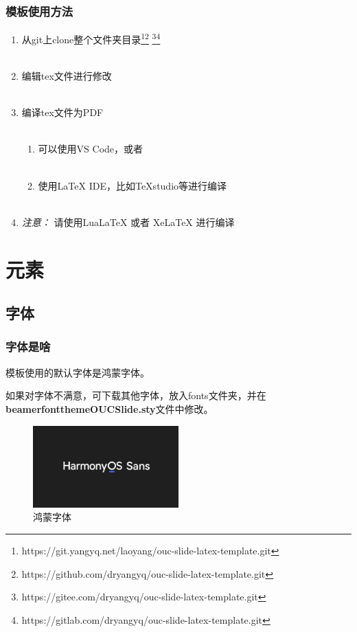 \documentclass[aspectratio=169,UTF8,t]{beamer}%
\begin{document}
\begin{frame}
    \frametitle{模板使用方法}    
    \begin{enumerate}
        \item 从git上clone整个文件夹目录\footnote{https://git.yangyq.net/laoyang/ouc-slide-latex-template.git }\footnote{https://github.com/dryangyq/ouc-slide-latex-template.git} \footnote{https://gitee.com/dryangyq/ouc-slide-latex-template.git}\footnote{https://gitlab.com/dryangyq/ouc-slide-latex-template.git}\\~
        \item 编辑tex文件进行修改\\~
        \item 编译tex文件为PDF\\~
        \begin{enumerate}
            \item 可以使用VS Code，或者\\~
            \item 使用LaTeX IDE，比如TeXstudio等进行编译\\~
        \end{enumerate}
        \item \emph{注意：} 请使用LuaLaTeX 或者 XeLaTeX 进行编译
    \end{enumerate}
\end{frame}

\section{元素}

\subsection{字体}

\begin{frame}
    \frametitle{字体是啥}
    模板使用的默认字体是鸿蒙字体。

    如果对字体不满意，可下载其他字体，放入fonts文件夹，并在\textbf{beamerfontthemeOUCSlide.sty}文件中修改。
    \begin{center}
        \begin{figure}
        \centering
        \includegraphics[width=0.5\textwidth]{figs/harmonysans.png}
            \caption{鸿蒙字体}
            \label{fig:harmonysans}
        \end{figure}
    \end{center}
\end{frame}
\end{document}
